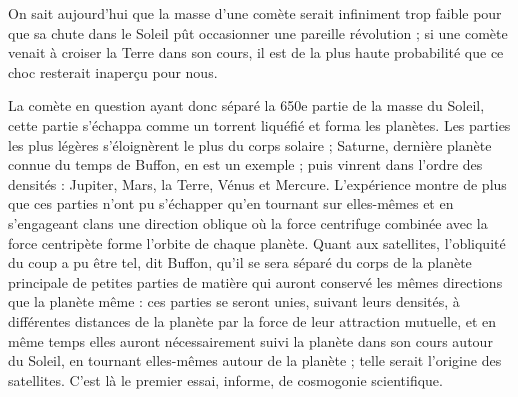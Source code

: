 \documentclass[a4paper, 11pt, oneside]{article}
\begin{document}
On sait aujourd'hui que la masse d'une comète serait infiniment trop faible pour que sa chute dans le Soleil pût occasionner une pareille révolution ; si une comète venait à croiser la Terre dans son cours, il est de la plus haute probabilité que ce choc resterait inaperçu pour nous.

La comète en question ayant donc séparé la 650e partie de la masse du Soleil, cette partie s'échappa comme un torrent liquéfié et forma les planètes. Les parties les plus légères s'éloignèrent le plus du corps solaire ; Saturne, dernière planète connue du temps de Buffon, en est un exemple ; puis vinrent dans l'ordre des densités : Jupiter, Mars, la Terre, Vénus et Mercure. L'expérience montre de plus que ces parties n'ont pu s'échapper qu'en tournant sur elles-mêmes et en s'engageant clans une direction oblique où la force centrifuge combinée avec la force centripète forme l'orbite de chaque planète. Quant aux satellites, l'obliquité du coup a pu être tel, dit Buffon, qu'il se sera séparé du corps de la planète principale de petites parties de matière qui auront conservé les mêmes directions que la planète même : ces parties se seront unies, suivant leurs densités, à différentes distances de la planète par la force de leur attraction mutuelle, et en même temps elles auront nécessairement suivi la planète dans son cours autour du Soleil, en tournant elles-mêmes autour de la planète ; telle serait l'origine des satellites. C'est là le premier essai, informe, de cosmogonie scientifique.
\end{document}

